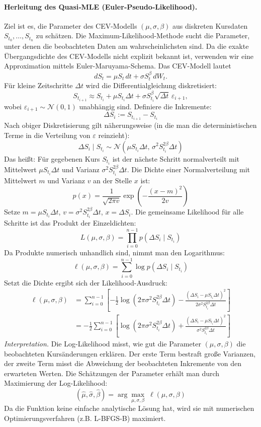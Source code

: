 \paragraph{Herleitung des Quasi‑MLE (Euler‑Pseudo‑Likelihood).}
Ziel ist es, die Parameter des CEV-Modells $(\mu, \sigma, \beta)$ aus diskreten Kursdaten $S_{t_0}, \dots, S_{t_n}$ zu schätzen. Die Maximum-Likelihood-Methode sucht die Parameter, unter denen die beobachteten Daten am wahrscheinlichsten sind. Da die exakte Übergangsdichte des CEV-Modells nicht explizit bekannt ist, verwenden wir eine Approximation mittels Euler-Maruyama-Schema.
Das CEV-Modell lautet
$$
dS_t = \mu S_t\,dt + \sigma S_t^{\beta}\,dW_t.
$$
Für kleine Zeitschritte $\Delta t$ wird die Differentialgleichung diskretisiert:
$$
S_{t_{i+1}} \approx S_{t_i} + \mu S_{t_i} \Delta t + \sigma S_{t_i}^{\beta} \sqrt{\Delta t}\, \varepsilon_{i+1},
$$
wobei $\varepsilon_{i+1} \sim \mathcal N(0,1)$ unabhängig sind.
Definiere die Inkremente:
$$
\Delta S_i := S_{t_{i+1}} - S_{t_i}
$$
Nach obiger Diskretisierung gilt näherungsweise (in die man die deterministischen Terme in die Verteilung von $\varepsilon$ reinzieht):
$$
\Delta S_i \mid S_{t_i} \sim \mathcal N\left(\mu S_{t_i} \Delta t,\, \sigma^2 S_{t_i}^{2\beta} \Delta t\right)
$$
Das heißt: Für gegebenen Kurs $S_{t_i}$ ist der nächste Schritt normalverteilt mit Mittelwert $\mu S_{t_i} \Delta t$ und Varianz $\sigma^2 S_{t_i}^{2\beta} \Delta t$.
Die Dichte einer Normalverteilung mit Mittelwert $m$ und Varianz $v$ an der Stelle $x$ ist:
$$
p(x) = \frac{1}{\sqrt{2\pi v}} \exp\left(-\frac{(x-m)^2}{2v}\right)
$$
Setze $m = \mu S_{t_i} \Delta t$, $v = \sigma^2 S_{t_i}^{2\beta} \Delta t$, $x = \Delta S_i$.
Die gemeinsame Likelihood für alle Schritte ist das Produkt der Einzeldichten:
$$
L(\mu, \sigma, \beta) = \prod_{i=0}^{n-1} p(\Delta S_i \mid S_{t_i})
$$
Da Produkte numerisch unhandlich sind, nimmt man den Logarithmus:
$$
\ell(\mu, \sigma, \beta) = \sum_{i=0}^{n-1} \log p(\Delta S_i \mid S_{t_i})
$$
Setzt die Dichte ergibt sich der Likelihood-Ausdruck:
\begin{align*}
\ell(\mu, \sigma, \beta) &= \sum_{i=0}^{n-1} \left[
    -\frac{1}{2} \log(2\pi \sigma^2 S_{t_i}^{2\beta} \Delta t)
    -\frac{(\Delta S_i - \mu S_{t_i} \Delta t)^2}{2 \sigma^2 S_{t_i}^{2\beta} \Delta t}
\right] \\
&= -\frac{1}{2} \sum_{i=0}^{n-1} \left[
    \log(2\pi \sigma^2 S_{t_i}^{2\beta} \Delta t)
    + \frac{(\Delta S_i - \mu S_{t_i} \Delta t)^2}{\sigma^2 S_{t_i}^{2\beta} \Delta t}
\right]
\end{align*}
\textit{Interpretation.} Die Log-Likelihood misst, wie gut die Parameter $(\mu, \sigma, \beta)$ die beobachteten Kursänderungen erklären. Der erste Term bestraft große Varianzen, der zweite Term misst die Abweichung der beobachteten Inkremente von den erwarteten Werten.
Die Schätzungen der Parameter erhält man durch Maximierung der Log-Likelihood:
$$
(\widehat{\mu}, \widehat{\sigma}, \widehat{\beta}) = \arg\max_{\mu, \sigma, \beta} \; \ell(\mu, \sigma, \beta)
$$
Da die Funktion keine einfache analytische Lösung hat, wird sie mit numerischen Optimierungsverfahren (z.B. L-BFGS-B) maximiert.

